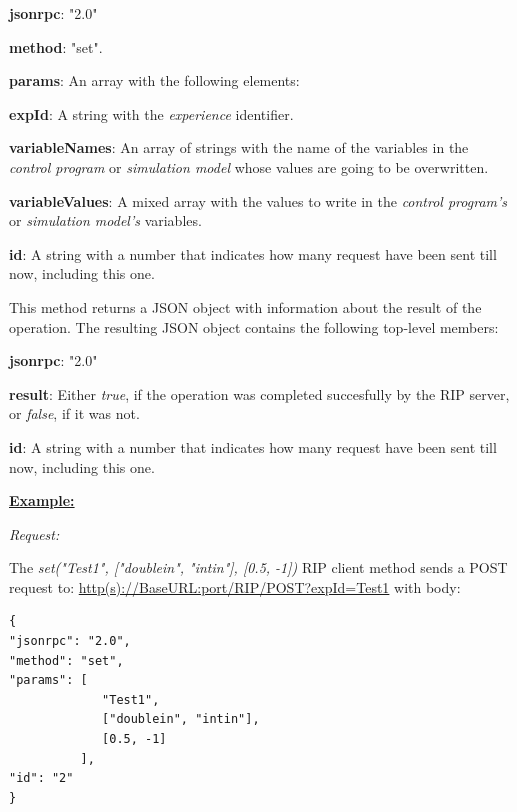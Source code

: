 \begin{myEnumerate}
    \item \textbf{jsonrpc}: "2.0"
    \item \textbf{method}: "set".
    \item \textbf{params}: An array with the following elements:
    \begin{myEnumerate}
        \item \textbf{expId}: A string with the \textit{experience} identifier.
        \item \textbf{variableNames}: An array of strings with the name of the variables in the \textit{control program} or \textit{simulation model} whose values are going to be overwritten.
        \item \textbf{variableValues}: A mixed array with the values to write in the \textit{control program's} or \textit{simulation model's} variables.
    \end{myEnumerate}
    \item \textbf{id}: A string with a number that indicates how many request have been sent till now, including this one.
\end{myEnumerate}

This method returns a JSON object with information about the result of the operation. The resulting JSON object contains the following top-level members:

\begin{myEnumerate}
    \item \textbf{jsonrpc}: "2.0"
    \item \textbf{result}: Either \textit{true}, if the operation was completed succesfully by the RIP server, or \textit{false}, if it was not.
    \item \textbf{id}: A string with a number that indicates how many request have been sent till now, including this one.
\end{myEnumerate}

\textbf{\underline{Example:}}

\textit{Request:}

The \textit{set("Test1", ["doublein", "intin"], [0.5, -1])} RIP client method sends a POST request to: \url{http(s)://BaseURL:port/RIP/POST?expId=Test1} with body:

\begin{lstlisting}
{
"jsonrpc": "2.0",
"method": "set",
"params": [
	         "Test1",
	         ["doublein", "intin"],
	         [0.5, -1]
          ],
"id": "2"
}
\end{lstlisting}

